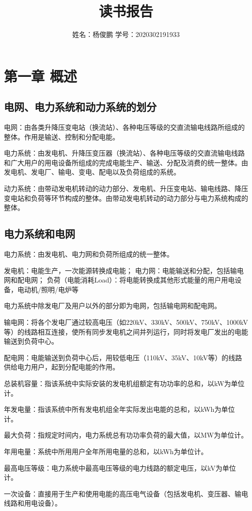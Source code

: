 \documentclass[UTF8, 12pt, a4paper]{ctexart}
\title{读书报告}
\author{姓名：杨俊鹏{} 学号：2020302191933}
\begin{document}
\maketitle
\section{第一章{} 概述}
\subsection{电网、电力系统和动力系统的划分}
电网：由各类升降压变电站（换流站）、各种电压等级的交直流输电线路所组成的整体。作用是输送、控制和分配电能。

电力系统：由发电机、升降压变压器（换流站）、各种电压等级的交直流输电线路和广大用户的用电设备所组成的完成电能生产、输送、分配及消费的统一整体。由发电机、发电厂、输电、变电、配电以及负荷组成的系统。

动力系统：由带动发电机转动的动力部分、发电机、升压变电站、输电线路、降压变电站和负荷等环节构成的整体。由带动发电机转动的动力部分与电力系统构成的整体。
\subsection{电力系统和电网}
电力系统：由发电机、电力网和负荷所组成的统一整体。

发电机：电能生产，一次能源转换成电能；
电力网：电能输送和分配，包括输电网和配电网；
负荷（电能消耗Load）：将电能转换成其他形式能量的用户用电设备，电动机/照明/电炉等

电力系统中除发电厂及用户以外的部分即为电网，包括输电网和配电网。

输电网：将各个发电厂通过较高电压（如220kV、330kV、500kV、750kV、1000kV等）的线路相互连接，使所有同步发电机之间并列运行，同时将发电厂发出的电能输送到负荷中心。

配电网：电能输送到负荷中心后，用较低电压（110kV、35kV、10kV等）的线路供给电力用户，起到分配电能的作用。

总装机容量：指该系统中实际安装的发电机组额定有功功率的总和，以kW为单位计。

年发电量：指该系统中所有发电机组全年实际发出电能的总和，以kWh为单位计。

最大负荷：指规定时间内，电力系统总有功功率负荷的最大值，以MW为单位计。

年用电量：系统中所用用户全年所用电量的总和，以kWh为单位计。

最高电压等级：电力系统中最高电压等级的电力线路的额定电压，以kV为单位计。

一次设备：直接用于生产和使用电能的高压电气设备（包括发电机、变压器、输电线路和用电设备）。
\end{document}
